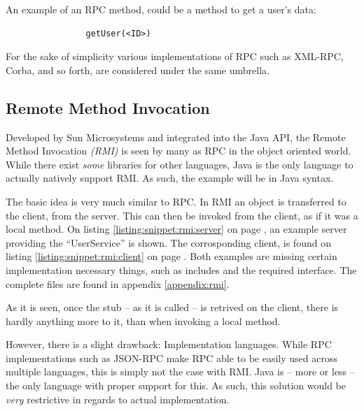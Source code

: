 			An example of an RPC method, could be a method to get a user's data:
			\begin{verbatim}
				getUser(<ID>)
			\end{verbatim}

			For the sake of simplicity various implementations of RPC such as XML-RPC, Corba, and so forth, are considered under the same umbrella.
		
		\subsection{Remote Method Invocation}
			Developed by Sun Microsystems and integrated into the Java API\cite{Downing:1998:JRR:522413}, the Remote Method Invocation \emph{(RMI)} is seen by many as RPC in the object oriented world. While there exist \emph{some} libraries for other languages, Java is the only language to actually natively support RMI. As such, the example will be in Java syntax.

			The basic idea is very much similar to RPC. In RMI an object is transferred to the client, from the server. This can then be invoked from the client, as if it was a local method. On listing \ref{listing:snippet:rmi:server} on page \pageref{listing:snippet:rmi:server}, an example server providing the ``UserService'' is shown. The corrosponding client, is found on listing \ref{listing:snippet:rmi:client} on page \pageref{listing:snippet:rmi:client}. Both examples are missing certain implementation necessary things, such as includes and the required interface. The complete files are found in appendix \ref{appendix:rmi}.

			As it is seen, once the stub -- as it is called -- is retrived on the client, there is hardly anything more to it, than when invoking a local method.

			

			

			However, there is a slight drawback: Implementation languages. While RPC implementations such as JSON-RPC make RPC able to be easily used across multiple languages, this is simply not the case with RMI. Java is -- more or less -- the only language with proper support for this. As such, this solution would be \emph{very} restrictive in regards to actual implementation.

